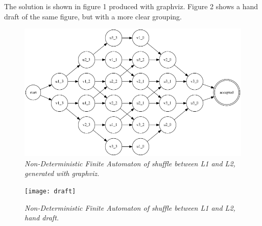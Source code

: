 \documentclass[a4paper,11pt,twoside]{article}
\begin{document}
The solution is shown in figure 1 produced with graphviz. Figure 2 shows a hand draft of the same figure, but with a more clear grouping.

\begin{figure}
  \centering
  \includegraphics[width=\textwidth]{graph}
  \caption{\textit{Non-Deterministic Finite Automaton of shuffle between L1 and L2, generated with graphviz.}}
  \label{fig:graph}
\end{figure}

\begin{figure}
  \centering
  \texttt{[image: draft]}
  \caption{\textit{Non-Deterministic Finite Automaton of shuffle between L1 and L2, hand draft.}}
  \label{fig:graph}
\end{figure}

%
\end{document}
